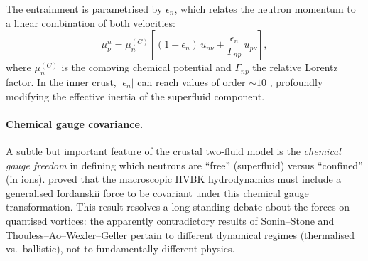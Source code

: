 The entrainment is parametrised by $\epsilon_{n}$, which relates the
neutron momentum to a linear combination of both velocities:
\begin{equation}
\label{eq:rel-60-entrainment}
\mu_{\nu}^{n} = \mu_{n}^{(C)}\!\left[
  (1-\epsilon_{n})\,u_{n\nu}
  + \frac{\epsilon_{n}}{\Gamma_{np}}\,u_{p\nu}
\right],
\end{equation}
where $\mu_{n}^{(C)}$ is the comoving chemical potential and
$\Gamma_{np}$ the relative Lorentz factor.  In the inner crust,
$|\epsilon_{n}|$ can reach values of order $\sim 10$
\cite{GavassinoAntonelliHaskellSuperfluid2021}, profoundly modifying the effective
inertia of the superfluid component.

\paragraph{Chemical gauge covariance.}
A subtle but important feature of the crustal two-fluid model is the
\emph{chemical gauge freedom} in defining which neutrons are ``free''
(superfluid) versus ``confined'' (in ions).
\citet{GavassinoAntonelliHaskellSuperfluid2021} proved that the macroscopic HVBK
hydrodynamics must include a generalised Iordanskii force to be
covariant under this chemical gauge transformation.  This result resolves
a long-standing debate about the forces on quantised vortices:
the apparently contradictory results of Sonin--Stone and
Thouless--Ao--Wexler--Geller pertain to different dynamical regimes
(thermalised vs.\ ballistic), not to fundamentally different physics.

